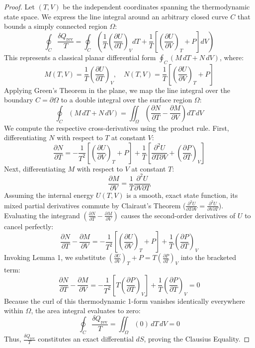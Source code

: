 \begin{proof}
Let $(T,V)$ be the independent coordinates spanning the thermodynamic state space. We express the line integral around an arbitrary closed curve $C$ that bounds a simply connected region $\Omega$:
\[
\oint_C \frac{\delta Q_{\text{rev}}}{T} = \oint_C \left( \frac{1}{T}\left(\frac{\partial U}{\partial T}\right)_V dT + \frac{1}{T}\left[\left(\frac{\partial U}{\partial V}\right)_T + P\right] dV \right)
\]
This represents a classical planar differential form $\oint_C (M\,dT + N\,dV)$, where:
\[
M(T,V) = \frac{1}{T}\left(\frac{\partial U}{\partial T}\right)_V, \quad N(T,V) = \frac{1}{T}\left[\left(\frac{\partial U}{\partial V}\right)_T + P\right]
\]
Applying Green's Theorem in the plane, we map the line integral over the boundary $C = \partial \Omega$ to a double integral over the surface region $\Omega$:
\[
\oint_C (M\,dT + N\,dV) = \iint_\Omega \left( \frac{\partial N}{\partial T} - \frac{\partial M}{\partial V} \right) dT\,dV
\]
We compute the respective cross-derivatives using the product rule. First, differentiating $N$ with respect to $T$ at constant $V$:
\[
\frac{\partial N}{\partial T} = -\frac{1}{T^2}\left[\left(\frac{\partial U}{\partial V}\right)_T + P\right] + \frac{1}{T}\left[ \frac{\partial^2 U}{\partial T \partial V} + \left(\frac{\partial P}{\partial T}\right)_V \right]
\]
Next, differentiating $M$ with respect to $V$ at constant $T$:
\[
\frac{\partial M}{\partial V} = \frac{1}{T}\frac{\partial^2 U}{\partial V \partial T}
\]
Assuming the internal energy $U(T,V)$ is a smooth, exact state function, its mixed partial derivatives commute by Clairaut's Theorem ($\frac{\partial^2 U}{\partial T \partial V} = \frac{\partial^2 U}{\partial V \partial T}$). Evaluating the integrand $(\frac{\partial N}{\partial T} - \frac{\partial M}{\partial V})$ causes the second-order derivatives of $U$ to cancel perfectly:
\[
\frac{\partial N}{\partial T} - \frac{\partial M}{\partial V} = -\frac{1}{T^2}\left[\left(\frac{\partial U}{\partial V}\right)_T + P\right] + \frac{1}{T}\left(\frac{\partial P}{\partial T}\right)_V
\]
Invoking Lemma 1, we substitute $\left(\frac{\partial U}{\partial V}\right)_T + P = T\left(\frac{\partial P}{\partial T}\right)_V$ into the bracketed term:
\[
\frac{\partial N}{\partial T} - \frac{\partial M}{\partial V} = -\frac{1}{T^2}\left[T\left(\frac{\partial P}{\partial T}\right)_V\right] + \frac{1}{T}\left(\frac{\partial P}{\partial T}\right)_V = 0
\]
Because the curl of this thermodynamic 1-form vanishes identically everywhere within $\Omega$, the area integral evaluates to zero:
\[
\oint_C \frac{\delta Q_{\text{rev}}}{T} = \iint_\Omega (0)\,dT\,dV = 0
\]
Thus, $\frac{\delta Q_{\text{rev}}}{T}$ constitutes an exact differential $dS$, proving the Clausius Equality.
\end{proof} 


